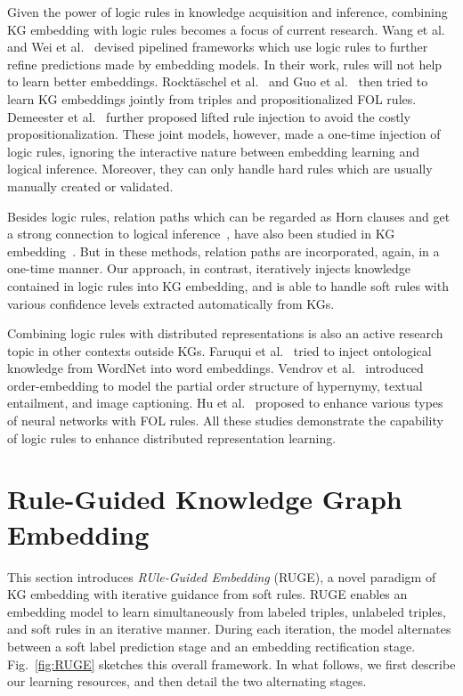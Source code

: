 \documentclass[letterpaper]{article} \usepackage{aaai18}  \usepackage{times}  \usepackage{helvet}  \usepackage{courier}  \usepackage{url}  \usepackage{graphicx}  \usepackage{amsmath}
\begin{document}
Given the power of logic rules in knowledge acquisition and inference, combining KG embedding with logic rules becomes a focus of current research. Wang et al.~ and Wei et al.~ devised pipelined frameworks which use logic rules to further refine predictions made by embedding models. In their work, rules will not help to learn better embeddings. Rockt\"{a}schel et al.~ and Guo et al.~ then tried to learn KG embeddings jointly from triples and propositionalized FOL rules. Demeester et al.~ further proposed lifted rule injection to avoid the costly propositionalization. These joint models, however, made a one-time injection of logic rules, ignoring the interactive nature between embedding learning and logical inference. Moreover, they can only handle hard rules which are usually manually created or validated.

Besides logic rules, relation paths which can be regarded as Horn clauses and get a strong connection to logical inference~\cite{gardner2015:Paths}, have also been studied in KG embedding~\cite{neelakantan2015:CompositionalVSM,lin2015:PTransE,guu2015:TraverseKG}. But in these methods, relation paths are incorporated, again, in a one-time manner. Our approach, in contrast, iteratively injects knowledge contained in logic rules into KG embedding, and is able to handle soft rules with various confidence levels extracted automatically from KGs.

Combining logic rules with distributed representations is also an active research topic in other contexts outside KGs. Faruqui et al.~ tried to inject ontological knowledge from WordNet into word embeddings. Vendrov et al.~ introduced order-embedding to model the partial order structure of hypernymy, textual entailment, and image captioning. Hu et al.~ proposed to enhance various types of neural networks with FOL rules. All these studies demonstrate the capability of logic rules to enhance distributed representation learning.

\section{Rule-Guided Knowledge Graph Embedding}
This section introduces \textit{RUle-Guided Embedding} (RUGE), a novel paradigm of KG embedding with iterative guidance from soft rules. RUGE enables an embedding model to learn simultaneously from labeled triples, unlabeled triples, and soft rules in an iterative manner. During each iteration, the model alternates between a soft label prediction stage and an embedding rectification stage. Fig.~\ref{fig:RUGE} sketches this overall framework. In what follows, we first describe our learning resources, and then detail the two alternating stages.
\end{document}
